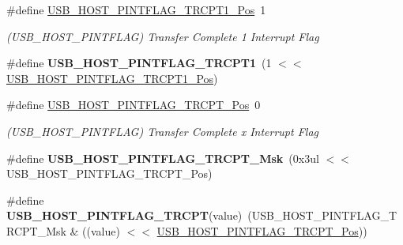 \begin{DoxyCompactItemize}
\item 
\hypertarget{group___s_a_m_l21___u_s_b_ga9d706438e9726dbfadf6e4497d3cb000}{}\#define \hyperlink{group___s_a_m_l21___u_s_b_ga9d706438e9726dbfadf6e4497d3cb000}{U\+S\+B\+\_\+\+H\+O\+S\+T\+\_\+\+P\+I\+N\+T\+F\+L\+A\+G\+\_\+\+T\+R\+C\+P\+T1\+\_\+\+Pos}~1\label{group___s_a_m_l21___u_s_b_ga9d706438e9726dbfadf6e4497d3cb000}

\begin{DoxyCompactList}\small\item\em (U\+S\+B\+\_\+\+H\+O\+S\+T\+\_\+\+P\+I\+N\+T\+F\+L\+A\+G) Transfer Complete 1 Interrupt Flag \end{DoxyCompactList}\item 
\hypertarget{group___s_a_m_l21___u_s_b_ga2f2ed8958e23fcf241d5f7aad7f43849}{}\#define {\bfseries U\+S\+B\+\_\+\+H\+O\+S\+T\+\_\+\+P\+I\+N\+T\+F\+L\+A\+G\+\_\+\+T\+R\+C\+P\+T1}~(1 $<$$<$ \hyperlink{group___s_a_m_l21___u_s_b_ga9d706438e9726dbfadf6e4497d3cb000}{U\+S\+B\+\_\+\+H\+O\+S\+T\+\_\+\+P\+I\+N\+T\+F\+L\+A\+G\+\_\+\+T\+R\+C\+P\+T1\+\_\+\+Pos})\label{group___s_a_m_l21___u_s_b_ga2f2ed8958e23fcf241d5f7aad7f43849}

\item 
\hypertarget{group___s_a_m_l21___u_s_b_ga6100840c1a4b0a3dcc08c85f542d28da}{}\#define \hyperlink{group___s_a_m_l21___u_s_b_ga6100840c1a4b0a3dcc08c85f542d28da}{U\+S\+B\+\_\+\+H\+O\+S\+T\+\_\+\+P\+I\+N\+T\+F\+L\+A\+G\+\_\+\+T\+R\+C\+P\+T\+\_\+\+Pos}~0\label{group___s_a_m_l21___u_s_b_ga6100840c1a4b0a3dcc08c85f542d28da}

\begin{DoxyCompactList}\small\item\em (U\+S\+B\+\_\+\+H\+O\+S\+T\+\_\+\+P\+I\+N\+T\+F\+L\+A\+G) Transfer Complete x Interrupt Flag \end{DoxyCompactList}\item 
\hypertarget{group___s_a_m_l21___u_s_b_ga6e6aafb86d0093fe19afe79d11a9e17b}{}\#define {\bfseries U\+S\+B\+\_\+\+H\+O\+S\+T\+\_\+\+P\+I\+N\+T\+F\+L\+A\+G\+\_\+\+T\+R\+C\+P\+T\+\_\+\+Msk}~(0x3ul $<$$<$ U\+S\+B\+\_\+\+H\+O\+S\+T\+\_\+\+P\+I\+N\+T\+F\+L\+A\+G\+\_\+\+T\+R\+C\+P\+T\+\_\+\+Pos)\label{group___s_a_m_l21___u_s_b_ga6e6aafb86d0093fe19afe79d11a9e17b}

\item 
\hypertarget{group___s_a_m_l21___u_s_b_ga90a8ebc6c8a4eb5a4d968f9ed074ddfb}{}\#define {\bfseries U\+S\+B\+\_\+\+H\+O\+S\+T\+\_\+\+P\+I\+N\+T\+F\+L\+A\+G\+\_\+\+T\+R\+C\+P\+T}(value)~(U\+S\+B\+\_\+\+H\+O\+S\+T\+\_\+\+P\+I\+N\+T\+F\+L\+A\+G\+\_\+\+T\+R\+C\+P\+T\+\_\+\+Msk \& ((value) $<$$<$ \hyperlink{group___s_a_m_l21___u_s_b_ga6100840c1a4b0a3dcc08c85f542d28da}{U\+S\+B\+\_\+\+H\+O\+S\+T\+\_\+\+P\+I\+N\+T\+F\+L\+A\+G\+\_\+\+T\+R\+C\+P\+T\+\_\+\+Pos}))\label{group___s_a_m_l21___u_s_b_ga90a8ebc6c8a4eb5a4d968f9ed074ddfb}


\end{DoxyCompactItemize}
